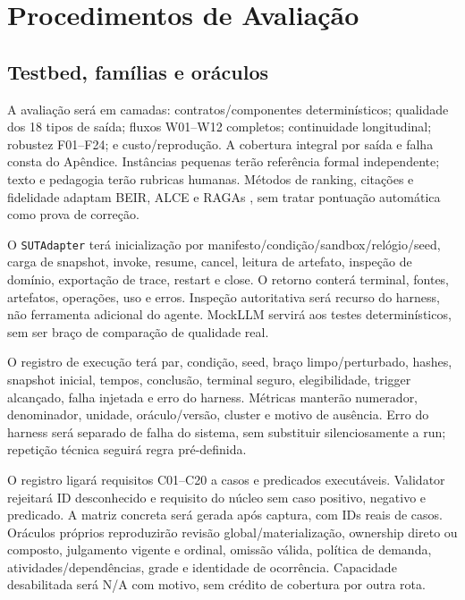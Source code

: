 \documentclass[12pt]{article}
\let\cite\citep
\newcommand{\code}[1]{\nolinkurl{#1}}
\begin{document}
\section{Procedimentos de Avaliação}
\label{sec:avaliacao}

\subsection{Testbed, famílias e oráculos}

A avaliação será em camadas: contratos/componentes determinísticos; qualidade dos 18 tipos de saída; fluxos W01--W12 completos; continuidade longitudinal; robustez F01--F24; e custo/reprodução. A cobertura integral por saída e falha consta do Apêndice. Instâncias pequenas terão referência formal independente; texto e pedagogia terão rubricas humanas. Métodos de ranking, citações e fidelidade adaptam BEIR, ALCE e RAGAs \cite{thakur2021beir,gao2023alce,es2024ragas}, sem tratar pontuação automática como prova de correção.

O \code{SUTAdapter} terá inicialização por manifesto/condição/sandbox/relógio/seed, carga de snapshot, invoke, resume, cancel, leitura de artefato, inspeção de domínio, exportação de trace, restart e close. O retorno conterá terminal, fontes, artefatos, operações, uso e erros. Inspeção autoritativa será recurso do harness, não ferramenta adicional do agente. MockLLM servirá aos testes determinísticos, sem ser braço de comparação de qualidade real.

O registro de execução terá par, condição, seed, braço limpo/perturbado, hashes, snapshot inicial, tempos, conclusão, terminal seguro, elegibilidade, trigger alcançado, falha injetada e erro do harness. Métricas manterão numerador, denominador, unidade, oráculo/versão, cluster e motivo de ausência. Erro do harness será separado de falha do sistema, sem substituir silenciosamente a run; repetição técnica seguirá regra pré-definida.

O registro ligará requisitos C01--C20 a casos e predicados executáveis. Validator rejeitará ID desconhecido e requisito do núcleo sem caso positivo, negativo e predicado. A matriz concreta será gerada após captura, com IDs reais de casos. Oráculos próprios reproduzirão revisão global/materialização, ownership direto ou composto, julgamento vigente e ordinal, omissão válida, política de demanda, atividades/dependências, grade e identidade de ocorrência. Capacidade desabilitada será N/A com motivo, sem crédito de cobertura por outra rota.
\end{document}
